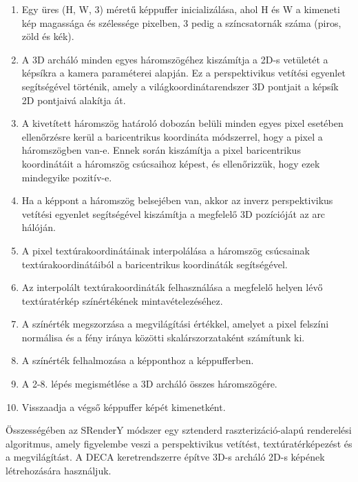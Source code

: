\documentclass[12pt,a4]{article}
\begin{document}
 \begin{enumerate}
 
    \item Egy üres (H, W, 3) méretű képpuffer inicializálása, ahol H és W a kimeneti kép magassága és szélessége pixelben, 3 pedig a színcsatornák száma (piros, zöld és kék).

    \item A 3D archáló minden egyes háromszögéhez kiszámítja a 2D-s vetületét a képsíkra a kamera paraméterei alapján. Ez a perspektivikus vetítési egyenlet segítségével történik, 
 amely a világkoordinátarendszer 3D pontjait a képsík 2D pontjaivá alakítja át.

    \item A kivetített háromszög határoló dobozán belüli minden egyes pixel esetében ellenőrzésre kerül a baricentrikus koordináta módszerrel, hogy a pixel a háromszögben van-e. 
Ennek során kiszámítja a pixel baricentrikus koordinátáit a háromszög csúcsaihoz képest, és ellenőrizzük, hogy ezek mindegyike pozitív-e.
 
    \item Ha a képpont a háromszög belsejében van, akkor az inverz perspektivikus vetítési egyenlet segítségével kiszámítja a megfelelő 3D pozícióját az arc hálóján.

    \item A pixel textúrakoordinátáinak interpolálása a háromszög csúcsainak textúrakoordinátáiból a baricentrikus koordináták segítségével.

    \item Az interpolált textúrakoordináták felhasználása a megfelelő helyen lévő textúratérkép színértékének mintavételezéséhez.

    \item A színérték megszorzása a megvilágítási értékkel, amelyet a pixel felszíni normálisa és a fény iránya közötti skalárszorzataként számítunk ki.

    \item A színérték felhalmozása a képponthoz a képpufferben.

    \item A 2-8. lépés megismétlése a 3D archáló összes háromszögére.

    \item Visszaadja a végső képpuffer képét kimenetként.
    
 \end{enumerate}

 Összességében az SRenderY módszer egy sztenderd raszterizáció-alapú renderelési algoritmus, amely figyelembe veszi a perspektivikus vetítést,
textúratérképezést és a megvilágítást. A DECA keretrendszerre építve 3D-s archáló 2D-s képének létrehozására használjuk.
\end{document}
